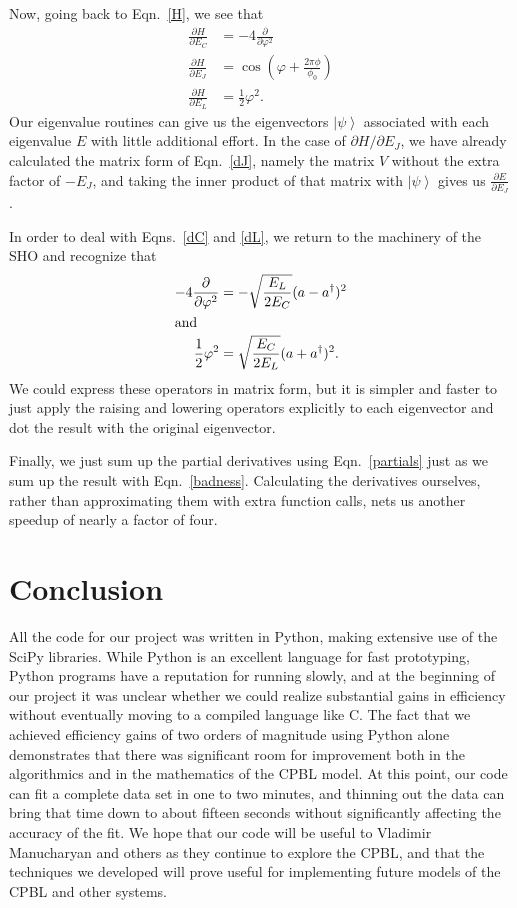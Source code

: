 \documentclass[twocolumn]{revtex4}
\newcommand{\ket}[1]{\left| #1 \right>}
\begin{document}
Now, going back to Eqn.~\eqref{H}, we see that
\begin{align}
  \label{dC}
  \frac{\partial H}{\partial E_C} &= -4\frac{\partial}{\partial
    \varphi^2}\\
  \label{dJ}
  \frac{\partial H}{\partial E_J} &= \cos(\varphi +
  \frac{2\pi\phi}{\phi_0})\\
  \label{dL}
  \frac{\partial H}{\partial E_L} &= \frac{1}{2}\varphi^2.
\end{align}
Our eigenvalue routines can give us the eigenvectors $\ket{\psi}$
associated with each eigenvalue $E$ with little additional effort. In
the case of $\partial H/\partial E_J$, we have already calculated the
matrix form of Eqn.~\eqref{dJ}, namely the matrix $V$ without the extra
factor of $-E_J$, and taking the inner product of that matrix with
$\ket{\psi}$ gives us $\frac{\partial E}{\partial E_J}$.

In order to deal with Eqns.~\ref{dC} and \ref{dL}, we return to the
machinery of the SHO and recognize that
\begin{align}
  -4\frac{\partial}{\partial \varphi^2} &= -\sqrt{\frac{E_L}{2E_C}}
  (a-a^\dagger)^2\\
  \intertext{and}
  \frac{1}{2}\varphi^2 &= \sqrt{\frac{E_C}{2E_L}} (a+a^\dagger)^2.
\end{align}
We could express these operators in matrix form, but it is simpler and
faster to just apply the raising and lowering operators explicitly to
each eigenvector and dot the result with the original eigenvector.

Finally, we just sum up the partial derivatives using
Eqn.~\eqref{partials} just as we sum up the result with
Eqn.~\eqref{badness}. Calculating the derivatives ourselves, rather than
approximating them with extra function calls, nets us another speedup
of nearly a factor of four.

\section{Conclusion}
All the code for our project was written in Python, making extensive
use of the SciPy libraries. While Python is an excellent language for
fast prototyping, Python programs have a reputation for running
slowly, and at the beginning of our project it was unclear whether we
could realize substantial gains in efficiency without eventually
moving to a compiled language like C. The fact that we achieved
efficiency gains of two orders of magnitude using Python alone
demonstrates that there was significant room for improvement both in
the algorithmics and in the mathematics of the CPBL model. At this
point, our code can fit a complete data set in one to two minutes, and
thinning out the data can bring that time down to about fifteen
seconds without significantly affecting the accuracy of the fit. We
hope that our code will be useful to Vladimir Manucharyan and others as
they continue to explore the CPBL, and that the techniques we
developed will prove useful for implementing future models of the CPBL
and other systems.
\end{document}
